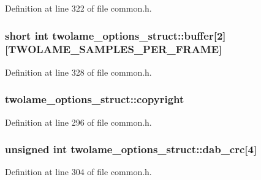 Definition at line 322 of file common.\+h.

\subsubsection[{\texorpdfstring{buffer}{buffer}}]{\setlength{\rightskip}{0pt plus 5cm}short {\bf int} twolame\+\_\+options\+\_\+struct\+::buffer\mbox{[}2\mbox{]}\mbox{[}{\bf T\+W\+O\+L\+A\+M\+E\+\_\+\+S\+A\+M\+P\+L\+E\+S\+\_\+\+P\+E\+R\+\_\+\+F\+R\+A\+ME}\mbox{]}}\hypertarget{structtwolame__options__struct_a032502082a28f2c52a3d7eaafff3bb7b}{}\label{structtwolame__options__struct_a032502082a28f2c52a3d7eaafff3bb7b}


Definition at line 328 of file common.\+h.

\subsubsection[{\texorpdfstring{copyright}{copyright}}]{ twolame\+\_\+options\+\_\+struct\+::copyright}\hypertarget{structtwolame__options__struct_af717c3e1c0f73752f0e5f81ab8338286}{}\label{structtwolame__options__struct_af717c3e1c0f73752f0e5f81ab8338286}


Definition at line 296 of file common.\+h.

\subsubsection[{\texorpdfstring{dab\+\_\+crc}{dab_crc}}]{\setlength{\rightskip}{0pt plus 5cm}unsigned {\bf int} twolame\+\_\+options\+\_\+struct\+::dab\+\_\+crc\mbox{[}4\mbox{]}}\hypertarget{structtwolame__options__struct_a81a3c1f7282199a782cbddabaaac544e}{}\label{structtwolame__options__struct_a81a3c1f7282199a782cbddabaaac544e}


Definition at line 304 of file common.\+h.

